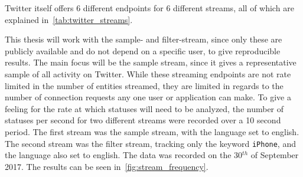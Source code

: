 Twitter itself offers 6 different endpoints for 6 different streams, all of which are explained in~\cref{tab:twitter_streams}.

\begin{table}
    \caption{All streams offered by Twitter~\cite{twitterDocs}}
    \label{tab:twitter_streams}
\end{table}

This thesis will work with the sample- and filter-stream, since only these are publicly available and do not depend on a specific user,
to give reproducible results.
The main focus will be the sample stream, since it gives a representative sample of all activity on Twitter.
While these streaming endpoints are not rate limited in the number of entities streamed,
they are limited in regards to the number of connection requests any one user or application can make.
To give a feeling for the rate at which statuses will need to be analyzed,
the number of statuses per second for two different streams were recorded over a 10 second period.
The first stream was the sample stream, with the language set to english.
The second stream was the filter stream, tracking only the keyword \texttt{iPhone}, and the language also set to english.
The data was recorded on the 30$^{th}$ of September 2017.
The results can be seen in~\cref{fig:stream_frequency}.

